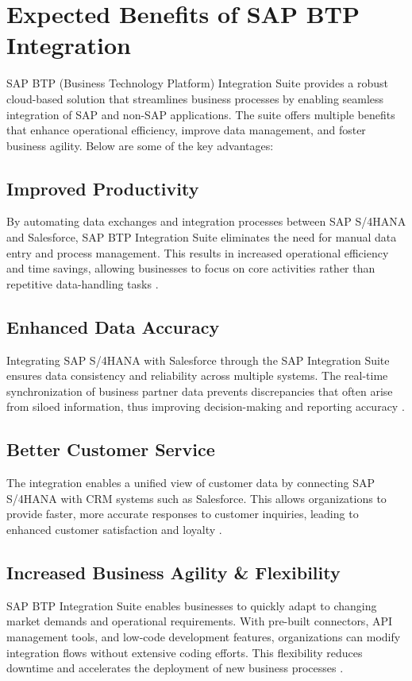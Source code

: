 \section{Expected Benefits of SAP BTP Integration}

SAP BTP (Business Technology Platform) Integration Suite provides a robust cloud-based solution that streamlines business processes by enabling seamless integration of SAP and non-SAP applications. The suite offers multiple benefits that enhance operational efficiency, improve data management, and foster business agility. Below are some of the key advantages:

\subsection{Improved Productivity}
By automating data exchanges and integration processes between SAP S/4HANA and Salesforce, SAP BTP Integration Suite eliminates the need for manual data entry and process management. This results in increased operational efficiency and time savings, allowing businesses to focus on core activities rather than repetitive data-handling tasks \cite{bagga2023practical}.

\subsection{Enhanced Data Accuracy}
Integrating SAP S/4HANA with Salesforce through the SAP Integration Suite ensures data consistency and reliability across multiple systems. The real-time synchronization of business partner data prevents discrepancies that often arise from siloed information, thus improving decision-making and reporting accuracy \cite{bagga2023introduction}.

\subsection{Better Customer Service}
The integration enables a unified view of customer data by connecting SAP S/4HANA with CRM systems such as Salesforce. This allows organizations to provide faster, more accurate responses to customer inquiries, leading to enhanced customer satisfaction and loyalty \cite{bagga2023introduction}.

\subsection{Increased Business Agility \& Flexibility}
SAP BTP Integration Suite enables businesses to quickly adapt to changing market demands and operational requirements. With pre-built connectors, API management tools, and low-code development features, organizations can modify integration flows without extensive coding efforts. This flexibility reduces downtime and accelerates the deployment of new business processes \cite{bagga2023practical}.

